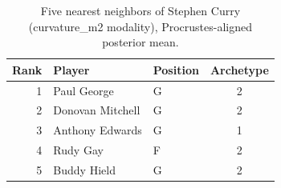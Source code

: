 \begin{table}[htbp]
  \centering\small
  \begin{tabular}{rllc}
    \toprule
    Rank & Player & Position & Archetype \\
    \midrule
    1 & Paul George & G & 2 \\
    2 & Donovan Mitchell & G & 2 \\
    3 & Anthony Edwards & G & 1 \\
    4 & Rudy Gay & F & 2 \\
    5 & Buddy Hield & G & 2 \\
    \bottomrule
  \end{tabular}
  \caption{Five nearest neighbors of Stephen Curry (curvature_m2 modality), Procrustes-aligned posterior mean.}
  \label{tab:Stephen_Curry_neighbors_curvature_m2}
\end{table}

